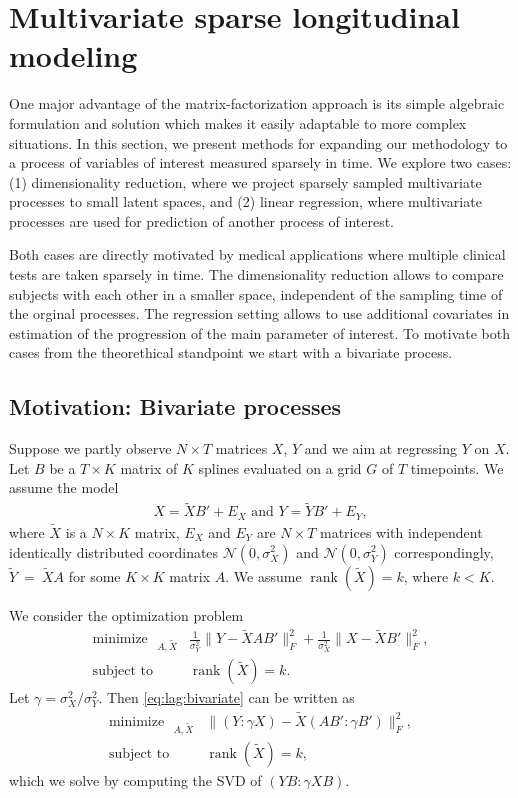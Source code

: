\documentclass[preprint]{imsart}
\numberwithin{equation}{section}
\theoremstyle{plain}
\newcommand{\cN}{\mathcal{N}}
\DeclareMathOperator*{\rank}{rank}
\DeclareMathOperator*{\minimize}{minimize\ \ }
\DeclareMathOperator*{\subjectto}{subject\ to\ \ }
\begin{document}
\section{Multivariate sparse longitudinal modeling}\label{s:multivariate}

One major advantage of the matrix-factorization approach is its simple algebraic formulation and solution which makes it easily adaptable to more complex situations. In this section, we present methods for expanding our methodology to a process of variables of interest measured sparsely in time. We explore two cases: (1) dimensionality reduction, where we project sparsely sampled multivariate processes to small latent spaces, and (2) linear regression, where multivariate processes are used for prediction of another process of interest.

Both cases are directly motivated by medical applications where multiple clinical tests are taken sparsely in time. The dimensionality reduction allows to compare subjects with each other in a smaller space, independent of the sampling time of the orginal processes. The regression setting allows to use additional covariates in estimation of the progression of the main parameter of interest. To motivate both cases from the theorethical standpoint we start with a bivariate process.

\subsection{Motivation: Bivariate processes}

Suppose we partly observe $N\times T$ matrices $X$, $Y$ and we aim at regressing $Y$ on $X$. Let $B$ be a $T\times K$ matrix of $K$ splines evaluated on a grid $G$ of $T$ timepoints. We assume the model \begin{align*}
X = \tilde{X}B' + E_X \text{ \ and \ } Y = \tilde{Y}B' + E_{Y},
\end{align*}
where $\tilde{X}$ is a $N\times K$ matrix, $E_X$ and $E_Y$ are $N \times T$ matrices with independent identically distributed coordinates $\cN(0,\sigma_X^2)$ and $\cN(0,\sigma_Y^2)$ correspondingly, $\tilde{Y}~=~\tilde{X}A$ for some $K\times K$ matrix $A$. We assume $\rank(\tilde{X}) = k$, where $k < K$.

We consider the optimization problem
\begin{align}\label{eq:lag:bivariate}
  \minimize_{A,\tilde{X}} & \frac{1}{\sigma_Y^2} \| Y - \tilde{X}AB' \|_F^2 + \frac{1}{\sigma_X^2}\|X - \tilde{X}B' \|_F^2,\nonumber\\
  \subjectto & \rank(\tilde{X}) = k.
\end{align}
Let $\gamma = \sigma_X^2 / \sigma_Y^2$. Then \eqref{eq:lag:bivariate} can be written as
\begin{align}\label{eq:lag:bivariate2}
  \minimize_{A,\tilde{X}} & \| (Y:\gamma X) - \tilde{X}(AB':\gamma B') \|_F^2,\nonumber\\
  \subjectto & \rank(\tilde{X}) = k,
\end{align}
which we solve by computing the SVD of $(YB:\gamma XB)$. 
\end{document}
